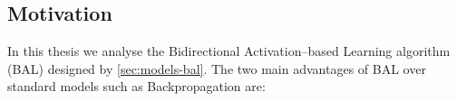 




\subsection*{Motivation}
\label{sec:motivation} 
In this thesis we analyse the Bidirectional Activation--based Learning algorithm (BAL) designed by \citet{farkas2013bal} \ref{sec:models-bal}. The two main advantages of BAL over standard models such as Backpropagation are: 

